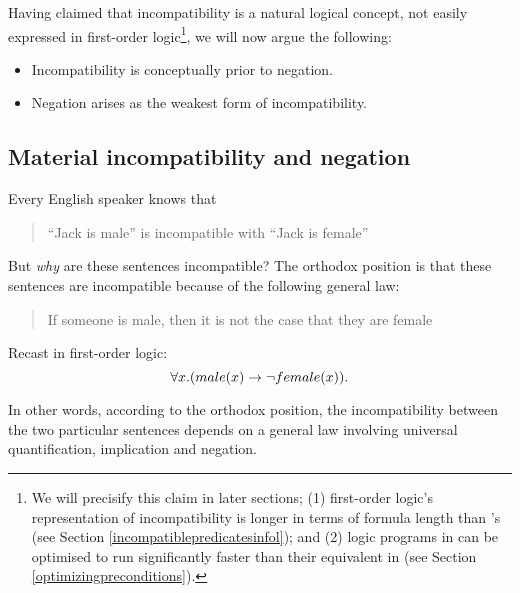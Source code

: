 Having claimed that incompatibility is a natural logical concept, not
easily expressed in first-order logic\footnote{We will precisify this
  claim in later sections; (1) first-order logic's representation of
  incompatibility is longer in terms of formula length than
  \cathoristic{}'s (see Section \ref{incompatiblepredicatesinfol});
  and (2) logic programs in \cathoristic{} can be optimised to run
  significantly faster than their equivalent in \fol{} (see Section
  \ref{optimizingpreconditions}).}, we will now argue the following:

\begin{itemize}

\item Incompatibility is conceptually prior to negation.

\item Negation arises as the weakest form of incompatibility.

\end{itemize}

\subsection{Material incompatibility and negation}

\NI Every English speaker knows that
\begin{quote}
``Jack is male'' is incompatible with ``Jack is female''
\end{quote}

\NI But \emph{why} are these sentences incompatible? The orthodox
position is that these sentences are incompatible because of the
following general law:
\begin{quote}
If someone is male, then it is not the case that they are female
\end{quote}
Recast in first-order logic:
\[
\forall x. ( male(x) \rightarrow \neg female(x) ).
\]

\NI In other words, according to the orthodox position, the
incompatibility between the two particular sentences depends on a
general law involving universal quantification, implication and
negation.

